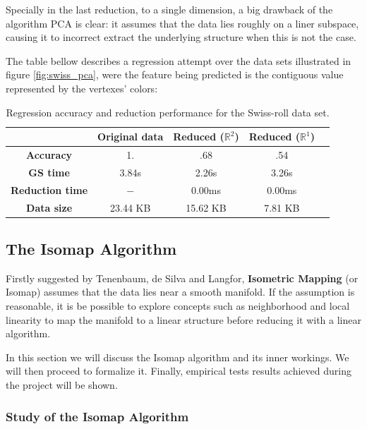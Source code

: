 \documentclass[12pt]{article}
\begin{document}
Specially in the last reduction, to a single dimension, a big drawback of the algorithm PCA is clear: it assumes that the data lies roughly on a liner subspace, causing it to incorrect extract the underlying structure when this is not the case. \cite{cay2005}

The table bellow describes a regression attempt over the data sets illustrated in figure \ref{fig:swiss_pca}, were the feature being predicted is the contiguous value represented by the vertexes' colors:

\begin{table}[H]
	\centering
	\begin{tabular}{|c|c|c|c|c|}
		\hline
		& \textbf{Original data} & \textbf{Reduced ($\mathbb{R}^2$)} & \textbf{Reduced ($\mathbb{R}^1$)} \\\hline
		\textbf{Accuracy}  & 1.       & .68       & .54 \\\hline
		\textbf{GS time}    & 3.84s  & 2.26s   & 3.26s \\\hline
		\textbf{Reduction time}    & $-$     & 0.00ms & 0.00ms \\\hline
		\textbf{Data size} & 23.44 KB & 15.62 KB  & 7.81 KB \\\hline
	\end{tabular}

	\caption{Regression accuracy and reduction performance for the Swiss-roll data set.}
\end{table}

\subsection{The Isomap Algorithm}

Firstly suggested by Tenenbaum, de Silva and Langfor, \textbf{Isometric Mapping} (or Isomap) assumes that the data lies near a smooth manifold. If the assumption is reasonable, it is be possible to explore concepts such as neighborhood and local linearity to map the manifold to a linear structure before reducing it with a linear algorithm.

In this section we will discuss the Isomap algorithm and its inner workings. We will then proceed to formalize it. Finally, empirical tests results achieved during the project will be shown.

\subsubsection{Study of the Isomap Algorithm}
\end{document}
